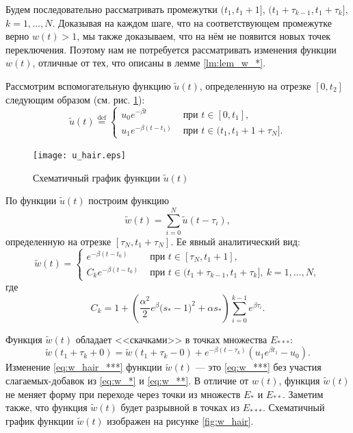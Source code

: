 Будем последовательно рассматривать промежутки $(t_1,t_1+1]$, $(t_1+\tau_{k-1},t_1+\tau_k]$, $k = 1,\ldots,N$. Доказывая на каждом шаге, что на соответствующем промежутке верно $w(t) > 1$, мы также доказываем, что на нём не появится новых точек переключения. Поэтому нам не потребуется рассматривать изменения функции $w(t)$, отличные от тех, что описаны в лемме \ref{lm:lem_w_*}.

Рассмотрим вспомогательную функцию $\tilde{u}(t)$, определенную на отрезке $[0,t_2]$ следующим образом (см. рис. \ref{fig:u_hair}): 
\begin{equation}
	\label{eq:u_hair}
	\tilde{u}(t)\stackrel{\text{def}}{=}\left\lbrace\begin{array}{cl}
		u_0e^{-\beta t} & \text{ при } t\in[0,t_1],
		\\
		u_1e^{-\beta (t-t_1)} & \text{ при } t\in(t_1,t_1+1+\tau_N].
	\end{array}\right.
\end{equation}
%
\begin{figure}
	\centering
	\texttt{[image: u\_hair.eps]}
	\caption{Схематичный график функции $\tilde{u}(t)$}
	\label{fig:u_hair}
\end{figure}
%

По функции $\tilde{u}(t)$ построим функцию
%
\[
\tilde{w}(t) = \sum_{i=0}^{N}\tilde{u}(t-\tau_i),
\]
%
определенную на отрезке $[\tau_N, t_1 + \tau_N]$. Ее явный аналитический вид:
%
\begin{equation}
	\label{eq:w_hair}
	\tilde{w}(t)=
	\begin{cases}
		e^{-\beta (t-t_0)} & \text{ при } t\in[\tau_N,t_1+1],\\
		C_k e^{-\beta(t-t_0)} & \text{ при } t\in(t_1 + \tau_{k-1}, t_1 + \tau_k],\ k=1,\ldots,N,
	\end{cases}
\end{equation}
где
\[C_k = 1+\left(\frac{\alpha^2}{2}e^\beta\big( s_*-1)^2+\alpha s_*\right)\sum_{i=0}^{k-1}e^{\beta \tau_i}.\]

Функция $\tilde{w}(t)$ обладает <<скачками>> в точках %
множества $E_{***}$:
\begin{equation}
	\label{eq:w_hair_***} 
	\tilde{w}(t_1 + \tau_k+0) = \tilde{w}(t_1 + \tau_k-0)+
	e^{-\beta(t-\tau_k)}(u_1 e^{\beta t_1}-u_0).
\end{equation}
%
Изменение \eqref{eq:w_hair_***} функции $\tilde{w}(t)$ --- это \eqref{eq:w_***} без участия слагаемых-добавок из \eqref{eq:w_*} и \eqref{eq:w_**}. В отличие от $w(t)$, функция $\tilde{w}(t)$ не меняет форму при переходе через точки из множеств $E_*$ и $E_{**}$. Заметим также, что функция $\tilde{w}(t)$ будет разрывной в точках из $E_{***}$. Схематичный график функции $\tilde{w}(t)$ изображен на рисунке \ref{fig:w_hair}.

